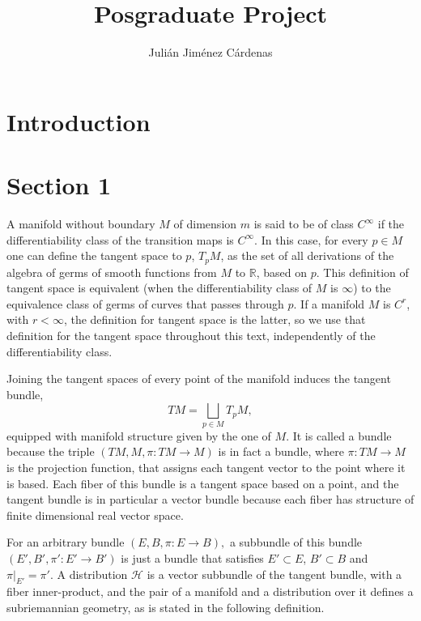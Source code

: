 \documentclass[12pt, letterpaper, reqno]{amsart}
\author{Julián Jiménez Cárdenas}
\title[Posgraduate Project]{Posgraduate Project}
\theoremstyle{definition}
\theoremstyle{plain}
\theoremstyle{remark}
\begin{document}
\maketitle

\begin{abstract}
\end{abstract}

\section*{Introduction}
\label{sec:0}


\section{Section 1}
\label{sec:1}

A manifold without boundary $M$ of dimension $ m $  is said to be of class $ C^\infty $ if the differentiability class of the transition maps is $C^\infty.$ In this case, for every $ p\in M $ one can define the tangent space to $ p $, $ T_pM $, as the set of all derivations of the algebra of germs of smooth functions from $ M $ to $ \mathbb{R}  $,  based on $ p $. This definition of tangent space is equivalent (when the differentiability class of $ M $ is $ \infty $) to the equivalence class of germs of curves that passes through $ p $. If a manifold $ M $  is $C^r$, with $r< \infty$, the definition for tangent space is the latter, so we use that definition for the tangent space throughout this text, independently of the differentiability class.

Joining the tangent spaces of every point of the manifold induces the tangent bundle,
$$ TM = \bigsqcup_{p\in M} T_pM, $$ 
equipped with manifold structure given by the one of $ M. $ It is called a bundle because the triple $ (TM, M,\pi:TM \rightarrow {M}) $ is in fact a bundle, where $ \pi:TM \rightarrow {M} $  is the projection function, that assigns each tangent vector to the point where it is based. Each fiber of this bundle is a tangent space based on a point, and the tangent bundle is in particular a vector bundle because each fiber has structure of finite dimensional real vector space. 

For an arbitrary bundle $ (E,B,\pi:E \rightarrow {B}), $ a subbundle of this bundle $ (E',B',\pi':E' \rightarrow {B'}) $  is just a bundle that satisfies $ E'\subset E $, $ B'\subset B $ and $ \pi|_{E'}=\pi'. $ A distribution $ \mathcal{H} $ is a vector subbundle of the tangent bundle, with a fiber inner-product, and the pair of a manifold and a distribution over it defines a subriemannian geometry, as is stated in the following definition.
\end{document}
